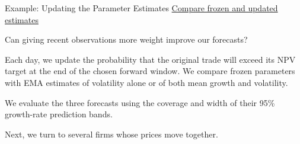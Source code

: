 \documentclass[aspectratio=169,11pt]{beamer}
\begin{document}
\begin{frame}{Example: Updating the Parameter Estimates}
\textbf{}
\href{https://github.com/varnerlab/CHEME-5660-CourseRepository-Fall-2026/blob/main/lectures/week-5/L5a/CHEME-5660-L5a-Example-EMA-SAGBM-Fall-2026.ipynb}{Compare frozen and updated estimates}

\vspace{0.8em}
Can giving recent observations more weight improve our forecasts?

\vspace{0.7em}
Each day, we update the probability that the original trade will exceed
its NPV target at the end of the chosen forward window. We compare frozen
parameters with EMA estimates of volatility alone or of both mean growth
and volatility.

\vspace{0.7em}
We evaluate the three forecasts using the coverage and width of their 95\%
growth-rate prediction bands.

\vspace{0.7em}
Next, we turn to several firms whose prices move together.
\end{frame}
\end{document}
